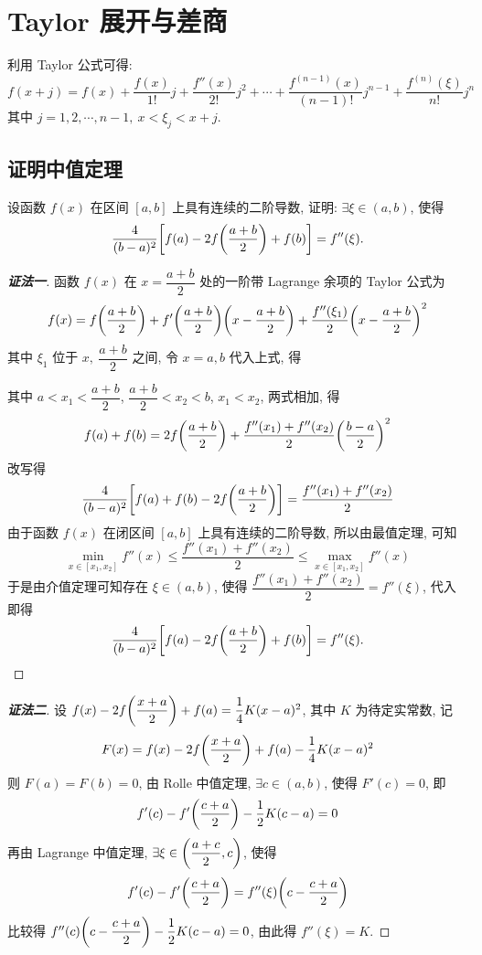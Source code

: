 \section{Taylor 展开与差商}

\begin{theorem}
    利用 Taylor 公式可得:
    $$f\left( x+j\right) =f(x) +\dfrac{f(x) }{1!}j+\dfrac{f''(x) }{2!}j^{2}+\cdots +\dfrac{f^{\left( n-1\right) }(x) }{\left( n-1\right) !}j^{n-1}+\dfrac{f^{(n) }(\xi ) }{n!}j^{n}$$
    其中 $j=1,2,\cdots,n-1,~x<\xi_j<x+j.$
\end{theorem}

\subsection{证明中值定理}

\begin{example}
    设函数 $f(x)$ 在区间 $[a,b]$ 上具有连续的二阶导数, 证明: $\exists\xi\in(a,b)$, 使得
    $$\dfrac{4}{(b-a)^2}\qty[f(a)-2f\qty(\dfrac{a+b}{2})+f(b)]=f''(\xi).$$
\end{example}
\begin{proof}[{\songti \textbf{证法一}}]
    函数 $f(x)$ 在 $x=\dfrac{a+b}{2}$ 处的一阶带 Lagrange 余项的 Taylor 公式为
    $$f(x)=f\qty(\dfrac{a+b}{2})+f'\qty(\dfrac{a+b}{2})\qty(x-\dfrac{a+b}{2})+\dfrac{f''(\xi_1)}{2}\qty(x-\dfrac{a+b}{2})^2$$
    其中 $\xi_1$ 位于 $x,~\dfrac{a+b}{2}$ 之间, 令 $x=a,b$ 代入上式, 得
    其中 $a<x_1<\dfrac{a+b}{2}$, $\dfrac{a+b}{2}<x_2<b$, $x_1<x_2$, 两式相加, 得
    $$f(a)+f(b)=2f\qty(\dfrac{a+b}{2})+\dfrac{f''(x_1)+f''(x_2)}{2}\qty(\dfrac{b-a}{2})^2$$
    改写得 $$\dfrac{4}{(b-a)^2}\qty[f(a)+f(b)-2f\qty(\dfrac{a+b}{2})]=\dfrac{f''(x_1)+f''(x_2)}{2}$$
    由于函数 $f(x)$ 在闭区间 $[a,b]$ 上具有连续的二阶导数, 所以由最值定理, 可知
    $$\min_{x\in[x_1,x_2]}f''(x)\leqslant \dfrac{f''(x_1)+f''(x_2)}{2}\leqslant \max_{x\in[x_1,x_2]}f''(x)$$
    于是由介值定理可知存在 $\xi\in(a,b)$, 使得 $\displaystyle \dfrac{f''(x_1)+f''(x_2)}{2}=f''(\xi)$, 
    代入即得 $$\dfrac{4}{(b-a)^2}\qty[f(a)-2f\qty(\dfrac{a+b}{2})+f(b)]=f''(\xi).$$
\end{proof}
\begin{proof}[{\songti \textbf{证法二}}]
    设 $f(x)-2f\qty(\dfrac{x+a}{2})+f(a)=\dfrac{1}{4}K(x-a)^2$, 其中 $K$ 为待定实常数, 记
    $$F(x)=f(x)-2f\qty(\dfrac{x+a}{2})+f(a)-\dfrac{1}{4}K(x-a)^2$$
    则 $F(a)=F(b)=0$, 由 Rolle 中值定理, $\exists c\in(a,b)$, 使得 $F'(c)=0$, 即
    $$f'(c)-f'\qty(\dfrac{c+a}{2})-\dfrac{1}{2}K(c-a)=0$$
    再由 Lagrange 中值定理, $\exists \xi\in\qty(\dfrac{a+c}{2},c)$, 使得
    $$f'(c)-f'\qty(\dfrac{c+a}{2})=f''(\xi)\qty(c-\dfrac{c+a}{2})$$
    比较得 $f''(c)\qty(c-\dfrac{c+a}{2})-\dfrac{1}{2}K(c-a)=0$, 由此得 $f''(\xi)=K.$
\end{proof}

